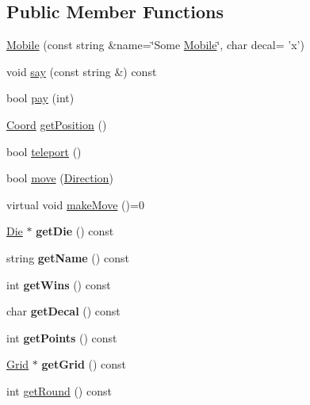 \subsection*{Public Member Functions}
\begin{DoxyCompactItemize}
\item 
\hyperlink{classMobile_ac67c8de2a67189c278ef953cbe337ad9}{Mobile} (const string \&name=\char`\"{}Some \hyperlink{classMobile}{Mobile}\char`\"{}, char decal= 'x')
\item 
void \hyperlink{classMobile_a085fdfda56dba07e7173210114e53ed8}{say} (const string \&) const 
\item 
bool \hyperlink{classMobile_aeae4ced0e1bb5433f06ed3af015692bf}{pay} (int)
\item 
\hyperlink{classCoord}{Coord} \hyperlink{classMobile_a7b4ec44c4073db2ac6eef940b11069e9}{getPosition} ()
\item 
bool \hyperlink{classMobile_ab5cbb7aa077299d4f710ec4c98e32e18}{teleport} ()
\item 
bool \hyperlink{classMobile_a959dafcc680bfacc9d4f04c0c93b5216}{move} (\hyperlink{classMobile_ad29e7ee47d99efad404c31ca4396cd5b}{Direction})
\item 
virtual void \hyperlink{classMobile_ae5ae474915a003b8df8feaef76646024}{makeMove} ()=0
\item 
\hypertarget{classMobile_a710b8ca820ca47179f24ed9deda9f3c6}{
\hyperlink{classDie}{Die} $\ast$ {\bfseries getDie} () const }
\label{classMobile_a710b8ca820ca47179f24ed9deda9f3c6}

\item 
\hypertarget{classMobile_a3e2ed062da96f86491409870f2f34dd6}{
string {\bfseries getName} () const }
\label{classMobile_a3e2ed062da96f86491409870f2f34dd6}

\item 
\hypertarget{classMobile_adc1e63e8dbc511c0b824695d6161493c}{
int {\bfseries getWins} () const }
\label{classMobile_adc1e63e8dbc511c0b824695d6161493c}

\item 
\hypertarget{classMobile_a03448355a83e0d6e746ece568a16093a}{
char {\bfseries getDecal} () const }
\label{classMobile_a03448355a83e0d6e746ece568a16093a}

\item 
\hypertarget{classMobile_a15d6626f43a812d7c4656dc3d907b292}{
int {\bfseries getPoints} () const }
\label{classMobile_a15d6626f43a812d7c4656dc3d907b292}

\item 
\hypertarget{classMobile_ab740ffc91c6d0a1239ac5693f7a54ea7}{
\hyperlink{classGrid}{Grid} $\ast$ {\bfseries getGrid} () const }
\label{classMobile_ab740ffc91c6d0a1239ac5693f7a54ea7}

\item 
int \hyperlink{classMobile_a63b2ce85151c39a5175a18d7a86eca90}{getRound} () const 
\end{DoxyCompactItemize}
